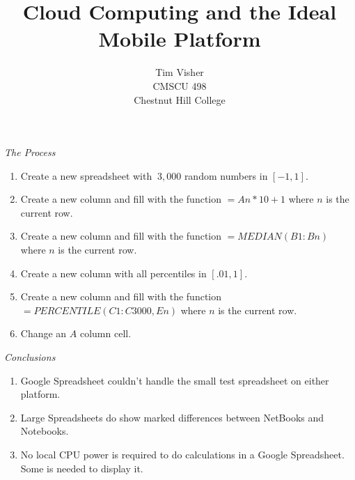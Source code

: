 \documentclass[letterpaper]{article}
\author{Tim Visher\\ CMSCU 498\\ Chestnut Hill College}
\title{Cloud Computing and the Ideal Mobile Platform}
\begin{document}
\Huge{

  \begin{center}
    \emph{The Process}
  \end{center}

\begin{enumerate}

\item Create a new spreadsheet with $~3,000$ random numbers in $[-1, 1]$.

\item Create a new column and fill with the function $=An*10+1$ where $n$ is the
  current row.

\item Create a new column and fill with the function $=MEDIAN(B1:Bn)$ where $n$ is
  the current row.

\item Create a new column with all percentiles in $[.01, 1]$.

\item Create a new column and fill with the function $=PERCENTILE(C1:C3000,En)$
  where $n$ is the current row.

\item Change an $A$ column cell.

\end{enumerate}

\newpage

\begin{center}
  \emph{Conclusions}
\end{center}

\begin{enumerate}

\item Google Spreadsheet couldn't handle the small test spreadsheet on either
  platform.

\item Large Spreadsheets do show marked differences between NetBooks and
  Notebooks.

\item No local CPU power is required to do calculations in a Google Spreadsheet.
  Some is needed to display it.

\end{enumerate}

}
\end{document}
